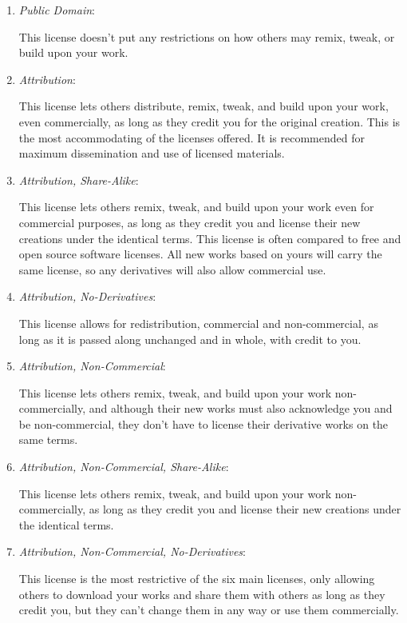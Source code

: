 \begin{enumerate}
  \item \emph{Public Domain}:

This license doesn't put any restrictions on how others may remix, tweak, or
build upon your work.

  \item \emph{Attribution}:

This license lets others distribute, remix, tweak, and build upon your work,
even commercially, as long as they credit you for the original creation. This
is the most accommodating of the licenses offered.  It is recommended for
maximum dissemination and use of licensed materials.

  \item \emph{Attribution, Share-Alike}:

This license lets others remix, tweak, and build upon your work even for
commercial purposes, as long as they credit you and license their new creations
under the identical terms.  This license is often compared to free and open
source software licenses.  All new works based on yours will carry the same
license, so any derivatives will also allow commercial use.

  \item \emph{Attribution, No-Derivatives}:

This license allows for redistribution, commercial and non-commercial, as long
as it is passed along unchanged and in whole, with credit to you.

  \item \emph{Attribution, Non-Commercial}:

This license lets others remix, tweak, and build upon your work
non-commercially, and although their new works must also acknowledge you and be
non-commercial, they don't have to license their derivative works on the same
terms.

  \item \emph{Attribution, Non-Commercial, Share-Alike}:

This license lets others remix, tweak, and build upon your work
non-commercially, as long as they credit you and license their new creations
under the identical terms.

  \item \emph{Attribution, Non-Commercial, No-Derivatives}:

This license is the most restrictive of the six main licenses, only allowing
others to download your works and share them with others as long as they credit
you, but they can't change them in any way or use them commercially.
\end{enumerate}

